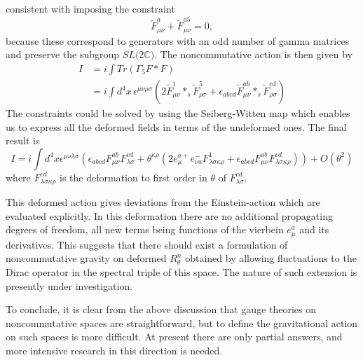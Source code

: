 \documentclass[a4paper,12pt]{article}
\begin{document}
consistent with imposing the constraint%
\[
\widetilde{F}_{\mu\nu}^{a}+\widetilde{F}_{\mu\nu}^{a5}=0,
\]
because these correspond to generators with an odd number of gamma matrices
and preserve the subgroup $SL(2\mathbb{C)}$. The noncommutative action is then
given by%
\begin{align*}
I &  =i\int Tr\left(  \Gamma_{5}F\ast F\right)  \\
&  =i\int d^{4}x\,\epsilon^{\mu\nu\rho\sigma}\left(  2\widetilde{F}_{\mu\nu
}^{1}\ast_{s}\widetilde{F}_{\rho\sigma}^{5}+\epsilon_{abcd}\widetilde{F}%
_{\mu\nu}^{ab}\ast_{s}\widetilde{F}_{\rho\sigma}^{cd}\right)
\end{align*}
The constraints could be solved by using the Seiberg-Witten map \cite{SW}
which enables us to express all the deformed fields in terms of the undeformed
ones. The final result is \cite{ali2}
\[
I=i\int d^{4}x\epsilon^{\mu\nu\lambda\sigma}\left(  \epsilon_{abcd}F_{\mu\nu
}^{ab}F_{\lambda\sigma}^{cd}+\theta^{\kappa\rho}\left(  2e_{\mu}^{a+}e_{\nu
a}^{-}F_{\lambda\sigma\kappa\rho}^{1}+\epsilon_{abcd}F_{\mu\nu}^{ab}%
F_{\lambda\sigma\kappa\rho}^{cd}\right)  \right)  +O(\theta^{2})
\]
where $F_{\lambda\sigma\kappa\rho}^{cd}$ is the deformation to first order in
$\theta$ of $F_{\lambda\sigma}^{cd}.$

This deformed action gives deviations from the Einstein-action which are
evaluated explicitly. In this deformation there are no additional propagating
degrees of freedom, all new terms being functions of the vierbein $e_{\mu}%
^{a}$ and its derivatives. This suggests that there should exist a formulation
of noncommutative gravity on deformed $R_{\theta}^{n}$ obtained by allowing
fluctuations to the Dirac operator in the spectral triple of this space. The
nature of such extension is presently under investigation.

To conclude, it is clear from the above discussion that gauge theories on
noncommutative spaces are straightforward, but to define the gravitational
action on such spaces is more difficult. At present there are only partial
answers, and more intensive research in this direction is needed.
\end{document}
